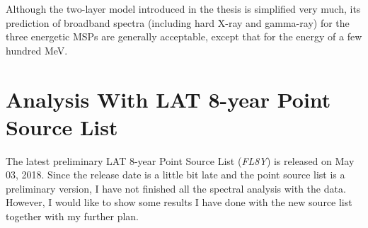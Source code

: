 \documentclass[12pt]{report}
\begin{document}
    Although the two-layer model introduced in the thesis is simplified very much, its prediction
    of broadband spectra (including hard X-ray and gamma-ray) for the three energetic MSPs are 
    generally acceptable, except that for the energy of a few hundred MeV.
    
     
  \section{Analysis With LAT 8-year Point Source List}
    The latest preliminary LAT 8-year Point Source List (\textit{FL8Y}) is released 
    on May 03, 2018. Since the release date is a little bit late and the point source list 
    is a preliminary version, I have not finished all the spectral analysis with the data.
    However, I would like to show some results I have done with the new source list
    together with my further plan.
\end{document}
